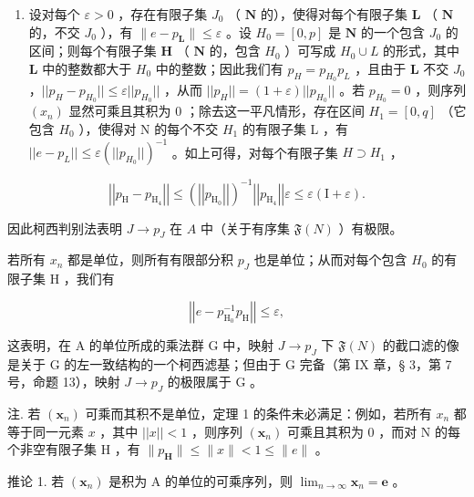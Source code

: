 \begin{enumerate}
\def\labelenumi{\alph{enumi})}
\setcounter{enumi}{1}
\tightlist
\item
  设对每个 \(\varepsilon > 0\) ，存在有限子集 \(J_0\) （ \(\mathbf{N}\) 的），使得对每个有限子集 \(\mathbf{L}\) （ \(\mathbf{N}\) 的，不交 \(J_0\) ），有 \(\|e - p_{\mathbf{L}}\| \leqslant \varepsilon\) 。设 \(H_0 = [0, p]\) 是 \(\mathbf{N}\) 的一个包含 \(J_0\) 的区间；则每个有限子集 \(\mathbf{H}\) （ \(\mathbf{N}\) 的，包含 \(H_0\) ）可写成 \(H_0 \cup L\) 的形式，其中 \(\mathbf{L}\) 中的整数都大于 \(H_0\) 中的整数；因此我们有 \(p_H = p_{H_0}p_L\) ，且由于 \(\mathbf{L}\) 不交 \(J_0\) ，\(||p_H - p_{H_0}|| \leqslant \varepsilon ||p_{H_0}||\) ，从而 \(||p_H|| = (1 + \varepsilon)||p_{H_0}||\) 。若 \(p_{H_0} = 0\) ，则序列 \((x_n)\) 显然可乘且其积为 0 ；除去这一平凡情形，存在区间 \(H_1 = [0, q]\) （它包含 \(H_0\) ），使得对 N 的每个不交 \(H_1\) 的有限子集 L ，有 \(||e - p_L|| \leqslant \varepsilon (||p_{H_0}||)^{-1}\) 。如上可得，对每个有限子集 \(H \supset H_1\) ，
\end{enumerate}

\[
\left| \left| p _ {\mathrm{H}} - p _ {\mathrm{H} _ {4}} \right| \right| \leqslant \left(\left| \left| p _ {\mathrm{H} _ {0}} \right| \right|\right) ^ {- 1} \left| \left| p _ {\mathrm{H} _ {4}} \right| \right| \varepsilon \leqslant \varepsilon (\mathrm{I} + \varepsilon).
\]

因此柯西判别法表明 \(J \to p_J\) 在 \(A\) 中（关于有序集 \(\mathfrak{F}(N)\) ）有极限。

若所有 \(x_{n}\) 都是单位，则所有有限部分积 \(p_{J}\) 也是单位；从而对每个包含 \(H_{0}\) 的有限子集 H ，我们有

\[
\left| \left| e - p _ {\mathrm{H} _ {0}} ^ {- 1} p _ {\mathrm{H}} \right| \right| \leqslant \varepsilon ,
\]

这表明，在 A 的单位所成的乘法群 G 中，映射 \(J \rightarrow p_{J}\) 下 \(\mathfrak{F}(N)\) 的截口滤的像是关于 G 的左一致结构的一个柯西滤基；但由于 G 完备（第 IX 章，§ 3，第 7 号，命题 13），映射 \(J \rightarrow p_{J}\) 的极限属于 G 。

注. 若 \((\pmb{x}_n)\) 可乘而其积不是单位，定理 1 的条件未必满足：例如，若所有 \(x_n\) 都等于同一元素 \(x\) ，其中 \(||x|| < 1\) ，则序列 \((\pmb{x}_n)\) 可乘且其积为 0 ，而对 N 的每个非空有限子集 H ，有 \(\| p_{\mathbf{H}} \| \leqslant \| x \| < 1 \leqslant \| e \|\) 。

推论 1. 若 \((\pmb{x}_n)\) 是积为 A 的单位的可乘序列，则 \(\lim_{n\to \infty}\pmb{x}_n = \pmb{e}\) 。

